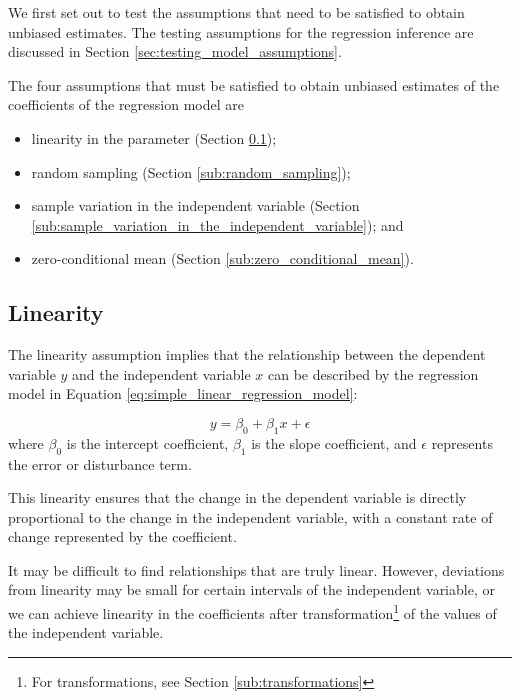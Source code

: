 We first set out to test the assumptions that need to be satisfied to obtain unbiased estimates. The testing assumptions for the regression inference are discussed in Section \ref{sec:testing_model_assumptions}.

\bigskip
The four assumptions that must be satisfied to obtain unbiased estimates of the coefficients of the regression model are

\begin{itemize}
\item linearity in the parameter (Section \ref{sub:linearity});
\item random sampling (Section \ref{sub:random_sampling});
\item sample variation in the independent variable (Section \ref{sub:sample_variation_in_the_independent_variable}); and
\item zero-conditional mean (Section \ref{sub:zero_conditional_mean}).
\end{itemize}

\subsection{Linearity} %
\label{sub:linearity}

The linearity assumption implies that the relationship between the dependent variable $y$ and the independent variable $x$ can be described by the regression model in Equation \ref{eq:simple_linear_regression_model}:

\begin{equation*}
y = \beta_0 + \beta_1x + \epsilon
\end{equation*}
where $\beta_0$ is the intercept coefficient, $\beta_1$ is the slope coefficient, and $\epsilon$ represents the error or disturbance term.

This linearity ensures that the change in the dependent variable is directly proportional to the change in the independent variable, with a constant rate of change represented by the coefficient. 

It may be difficult to find relationships that are truly linear. However, deviations from linearity may be small for certain intervals of the independent variable, or we can achieve linearity in the coefficients after transformation\footnote{For transformations, see Section \ref{sub:transformations}} of the values of the independent variable.
 
